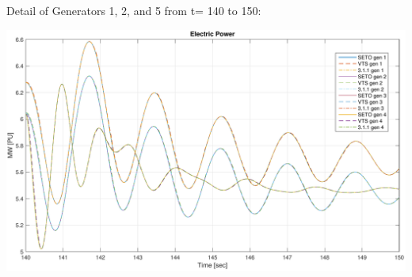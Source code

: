 \documentclass[12pt]{article}
\begin{document}
Detail of Generators 1, 2, and 5 from t= 140 to 150:

\includegraphics[width=\linewidth]{verPelectDetail}
\end{document}
